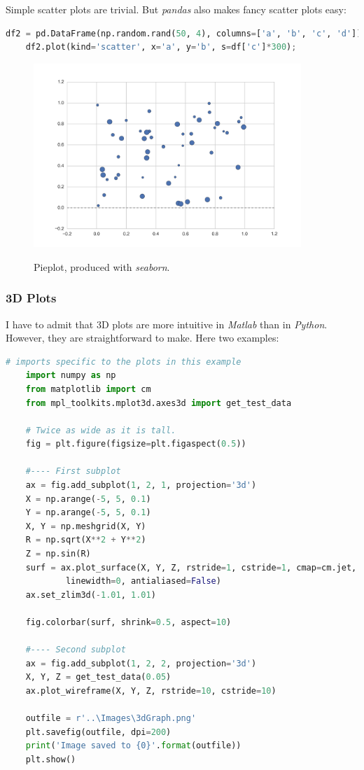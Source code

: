 Simple scatter plots are trivial. But \emph{pandas} also makes fancy scatter plots easy:

\begin{lstlisting}[language=Python]
    df2 = pd.DataFrame(np.random.rand(50, 4), columns=['a', 'b', 'c', 'd'])
    df2.plot(kind='scatter', x='a', y='b', s=df['c']*300);
\end{lstlisting}

\begin{figure}[H]
  \centering
  \includegraphics[width=0.9\textwidth]{../Images/bivariate.png}\\
  \caption{Pieplot, produced with \emph{seaborn}.}\label{fig:bivariate}
\end{figure}

\subsubsection{3D Plots}

I have to admit that 3D plots are more intuitive in \emph{Matlab} than in \emph{Python}. However, they are straightforward to make. Here two examples:

\begin{lstlisting}[language=Python]
      # imports specific to the plots in this example
    import numpy as np
    from matplotlib import cm
    from mpl_toolkits.mplot3d.axes3d import get_test_data

    # Twice as wide as it is tall.
    fig = plt.figure(figsize=plt.figaspect(0.5))

    #---- First subplot
    ax = fig.add_subplot(1, 2, 1, projection='3d')
    X = np.arange(-5, 5, 0.1)
    Y = np.arange(-5, 5, 0.1)
    X, Y = np.meshgrid(X, Y)
    R = np.sqrt(X**2 + Y**2)
    Z = np.sin(R)
    surf = ax.plot_surface(X, Y, Z, rstride=1, cstride=1, cmap=cm.jet,
            linewidth=0, antialiased=False)
    ax.set_zlim3d(-1.01, 1.01)

    fig.colorbar(surf, shrink=0.5, aspect=10)

    #---- Second subplot
    ax = fig.add_subplot(1, 2, 2, projection='3d')
    X, Y, Z = get_test_data(0.05)
    ax.plot_wireframe(X, Y, Z, rstride=10, cstride=10)

    outfile = r'..\Images\3dGraph.png'
    plt.savefig(outfile, dpi=200)
    print('Image saved to {0}'.format(outfile))
    plt.show()
\end{lstlisting}

